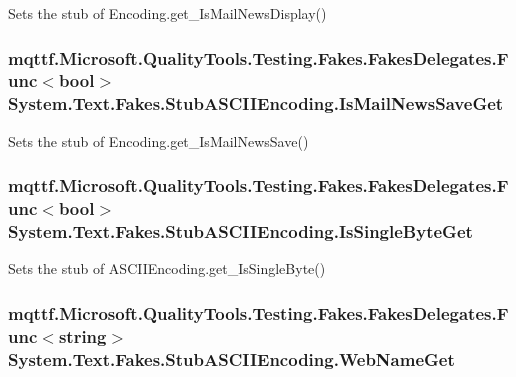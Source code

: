 Sets the stub of Encoding.\-get\-\_\-\-Is\-Mail\-News\-Display()

\hypertarget{class_system_1_1_text_1_1_fakes_1_1_stub_a_s_c_i_i_encoding_a514a9955a907d658ec49dd2ff5c19d1d}{
\subsubsection[{Is\-Mail\-News\-Save\-Get}]{\setlength{\rightskip}{0pt plus 5cm}mqttf.\-Microsoft.\-Quality\-Tools.\-Testing.\-Fakes.\-Fakes\-Delegates.\-Func$<$bool$>$ System.\-Text.\-Fakes.\-Stub\-A\-S\-C\-I\-I\-Encoding.\-Is\-Mail\-News\-Save\-Get}}\label{class_system_1_1_text_1_1_fakes_1_1_stub_a_s_c_i_i_encoding_a514a9955a907d658ec49dd2ff5c19d1d}


Sets the stub of Encoding.\-get\-\_\-\-Is\-Mail\-News\-Save()

\hypertarget{class_system_1_1_text_1_1_fakes_1_1_stub_a_s_c_i_i_encoding_ac0a70203ba492530499a6c735e57f43e}{
\subsubsection[{Is\-Single\-Byte\-Get}]{\setlength{\rightskip}{0pt plus 5cm}mqttf.\-Microsoft.\-Quality\-Tools.\-Testing.\-Fakes.\-Fakes\-Delegates.\-Func$<$bool$>$ System.\-Text.\-Fakes.\-Stub\-A\-S\-C\-I\-I\-Encoding.\-Is\-Single\-Byte\-Get}}\label{class_system_1_1_text_1_1_fakes_1_1_stub_a_s_c_i_i_encoding_ac0a70203ba492530499a6c735e57f43e}


Sets the stub of A\-S\-C\-I\-I\-Encoding.\-get\-\_\-\-Is\-Single\-Byte()

\hypertarget{class_system_1_1_text_1_1_fakes_1_1_stub_a_s_c_i_i_encoding_a4b50e5df574e8565c08a0626e6c9ddd9}{
\subsubsection[{Web\-Name\-Get}]{\setlength{\rightskip}{0pt plus 5cm}mqttf.\-Microsoft.\-Quality\-Tools.\-Testing.\-Fakes.\-Fakes\-Delegates.\-Func$<$string$>$ System.\-Text.\-Fakes.\-Stub\-A\-S\-C\-I\-I\-Encoding.\-Web\-Name\-Get}}\label{class_system_1_1_text_1_1_fakes_1_1_stub_a_s_c_i_i_encoding_a4b50e5df574e8565c08a0626e6c9ddd9}


